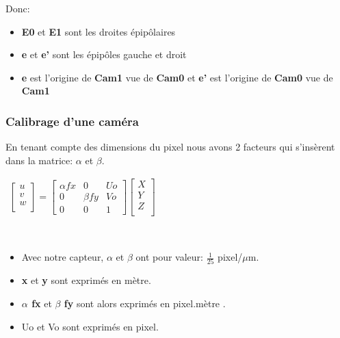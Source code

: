 \documentclass[12pt, french]{report}
\begin{document}
Donc: \\
\begin{itemize}
    \item \textbf{E0} et \textbf{E1} sont les droites épipôlaires
    \item \textbf{e} et \textbf{e'} sont les épipôles gauche et droit
    \item \textbf{e} est l'origine de \textbf{Cam1} vue de \textbf{Cam0} et \textbf{e'} est l'origine de \textbf{Cam0} vue de \textbf{Cam1}\\
\end{itemize} 


\subsubsection{Calibrage d'une caméra}

En tenant compte des dimensions du pixel nous avons 2 facteurs qui s'insèrent dans la matrice: \textbf{$\alpha$} et \textbf{$\beta$}.\\

\begin{center}
    $\begin{matrix}
        \begin{bmatrix}
            u\\v\\w\\
        \end{bmatrix}
        =
        \begin{bmatrix}
            \alpha fx &0 &Uo\\
            0&\beta fy&Vo\\
            0&0&1
        \end{bmatrix}
        \begin{bmatrix}
            X\\Y\\Z\\
        \end{bmatrix}
    \end{matrix}$
\end{center}\\
\begin{itemize}
    \item Avec notre capteur, \textbf{$\alpha$} et \textbf{$\beta$} ont pour valeur:  $\frac{1}{25}$ pixel/$\mu$m.
    \item \textbf{x} et \textbf{y} sont exprimés en mètre.
    \item \textbf{$\alpha$ fx} et \textbf{$\beta$ fy} sont alors exprimés en pixel.mètre . 
    \item Uo et Vo  sont exprimés en pixel. \\
\end{itemize}
\end{document}
